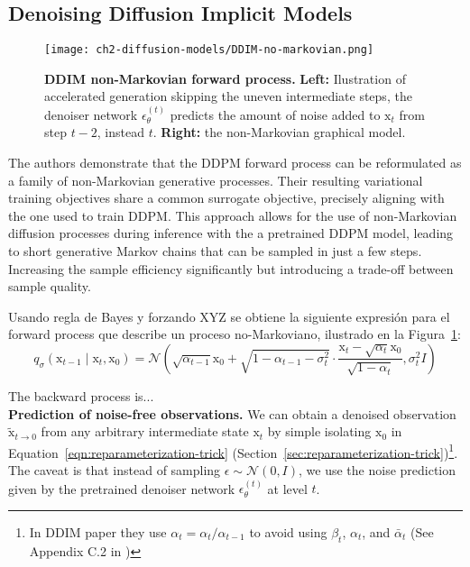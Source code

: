 
\subsection{Denoising Diffusion Implicit Models}\label{sec:DDIM}
\begin{figure}[t]
  \centering
  \texttt{[image: ch2-diffusion-models/DDIM-no-markovian.png]}
  \captionsetup{width=\textwidth} %
  \caption{\textbf{DDIM non-Markovian forward process.} \textbf{Left:} Ilustration of accelerated generation skipping the uneven intermediate steps, the denoiser network $\epsilon_{\theta}^{(t)}$ predicts the amount of noise added to $\mathrm{x}_{t}$ from step $t-2$, instead $t$. \textbf{Right:} the non-Markovian graphical model.}
  \label{fig:ddim-non-markovian}
\end{figure}

The authors demonstrate that the DDPM forward process can be reformulated as a family of non-Markovian generative processes. Their resulting variational training objectives share a common surrogate objective, precisely aligning with the one used to train DDPM. This approach allows for the use of non-Markovian diffusion processes during inference with the a pretrained DDPM model, leading to short generative Markov chains that can be sampled in just a few steps. Increasing the sample efficiency significantly but introducing a trade-off between sample quality.

\noindent Usando regla de Bayes y forzando XYZ se obtiene la siguiente expresión para el forward process que describe un proceso no-Markoviano, ilustrado en la Figura~\ref{fig:ddim-non-markovian}:
\begin{equation}\label{eqn:ddim-non-markovian-marginal-eqn7}
    q_{\sigma}(\mathrm{x}_{t-1}\mid\mathrm{x}_{t}, \mathrm{x}_{0}) = \mathcal{N}(\sqrt{\alpha_{t-1}} \mathrm{x}_0 + \sqrt{1 - \alpha_{t-1} - \sigma_{t}^{2}}\cdot\frac{\mathrm{x}_{t} - \sqrt{\alpha_{t}}\mathrm{x}_{0}}{\sqrt{1-\alpha_{t}}}, \sigma_{t}^{2}I)
\end{equation}

\noindent The backward process is...\\

\noindent \textbf{Prediction of noise-free observations.} We can obtain 
a denoised observation $\tilde{\mathrm{x}}_{t\rightarrow 0}$ from any arbitrary
intermediate state $\mathrm{x}_{t}$ by simple isolating $\mathrm{x}_{0}$ in Equation~\ref{eqn:reparameterization-trick} (Section~\ref{sec:reparameterization-trick})\footnote{In DDIM paper they use $\alpha_{t}=\alpha_{t} / \alpha_{t-1}$ to avoid using $\beta_{t}$, $\alpha_{t}$, and $\bar{\alpha}_{t}$ (See Appendix C.2 in \cite{song2020denoising})}. The caveat is that instead of sampling
 $\epsilon\sim\mathcal{N}(0, I)$,  we use the noise prediction given by the pretrained denoiser network $\epsilon_{\theta}^{(t)}$ at level $t$.

